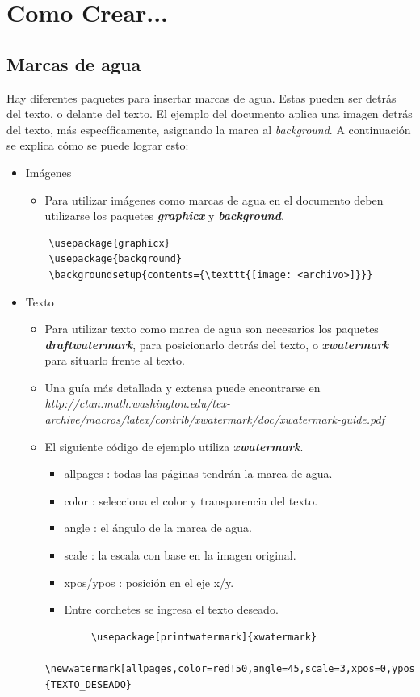 \documentclass[10pt,journal,compsoc]{IEEEtran}
\begin{document}
\section{Como Crear...}

\subsection{Marcas de agua}
Hay diferentes paquetes para insertar marcas de agua. Estas pueden ser detr\'as del texto, o delante del texto. El ejemplo del documento aplica una imagen detr\'as del texto, m\'as espec\'ificamente, asignando la marca al \emph{background}. A continuaci\'on se explica c\'omo se puede lograr esto:
\begin{itemize}
	\item Im\'agenes
	\begin{itemize}
		\item Para utilizar im\'agenes como marcas de agua en el documento deben utilizarse los paquetes \textbf{\textit{graphicx}} y \textbf{\textit{background}}.	
	\end{itemize}
	\begin{lstlisting}
	\usepackage{graphicx}
	\usepackage{background}
	\backgroundsetup{contents={\texttt{[image: <archivo>]}}}
	\end{lstlisting}
	\item Texto
	\begin{itemize}
		\item Para utilizar texto como marca de agua son necesarios los paquetes \textbf{\textit{draftwatermark}}, para posicionarlo detr\'as del texto, o \textbf{\textit{xwatermark}} para situarlo frente al texto.
		\item Una gu\'ia m\'as detallada y extensa puede encontrarse en \emph{http://ctan.math.washington.edu/tex-archive/macros/latex/contrib/xwatermark/doc/xwatermark-guide.pdf}
		\item El siguiente c\'odigo de ejemplo utiliza \textbf{\textit{xwatermark}}.
		\begin{itemize}
			\item allpages : todas las p\'aginas tendr\'an la marca de agua.
			\item color : selecciona el color y transparencia del texto.
			\item angle : el \'angulo de la marca de agua.
			\item scale : la escala con base en la imagen original.
			\item xpos/ypos : posici\'on en el eje x/y.
			\item Entre corchetes se ingresa el texto deseado.
		\end{itemize}	
		\begin{lstlisting}
		\usepackage[printwatermark]{xwatermark}
		\newwatermark[allpages,color=red!50,angle=45,scale=3,xpos=0,ypos=0]{TEXTO_DESEADO}
		\end{lstlisting}
	\end{itemize}
\end{itemize}
\end{document}
